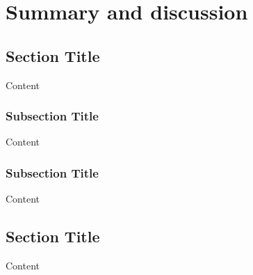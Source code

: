 \documentclass[../main.tex]{subfiles}
\begin{document}
\chapter{Summary and discussion} %

\label{ch:summ} %


\section{Section Title}

Content


\subsection{Subsection Title}

Content


\subsection{Subsection Title}

Content


\section{Section Title}

Content
\end{document}
